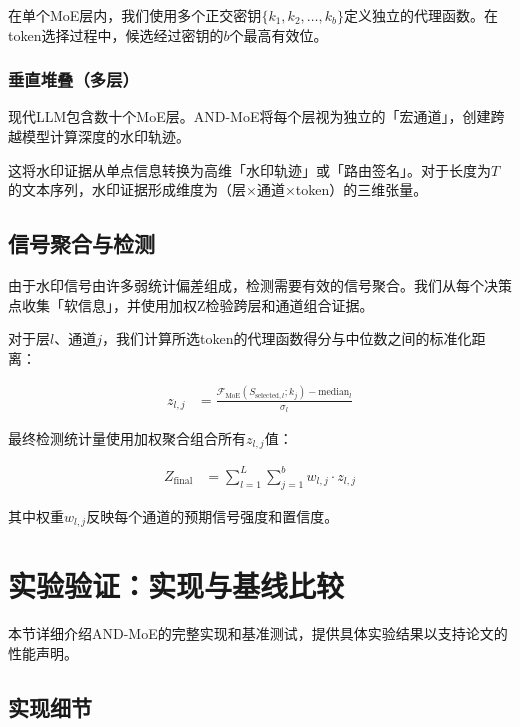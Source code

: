 \documentclass[letterpaper,twocolumn,10pt]{article}
\begin{document}
在单个MoE层内，我们使用多个正交密钥$\{k_1, k_2, \ldots, k_b\}$定义独立的代理函数。在token选择过程中，候选经过密钥的$b$个最高有效位。

\subsubsection{垂直堆叠（多层）}

现代LLM包含数十个MoE层。AND-MoE将每个层视为独立的「宏通道」，创建跨越模型计算深度的水印轨迹。

这将水印证据从单点信息转换为高维「水印轨迹」或「路由签名」。对于长度为$T$的文本序列，水印证据形成维度为（层×通道×token）的三维张量。

\subsection{信号聚合与检测}

由于水印信号由许多弱统计偏差组成，检测需要有效的信号聚合。我们从每个决策点收集「软信息」，并使用加权Z检验跨层和通道组合证据。

对于层$l$、通道$j$，我们计算所选token的代理函数得分与中位数之间的标准化距离：

\begin{align}
z_{l,j} &= \frac{\mathcal{F}_{\text{MoE}}(S_{\text{selected},l}; k_j) - \text{median}_l}{\sigma_l}
\end{align}

最终检测统计量使用加权聚合组合所有$z_{l,j}$值：

\begin{align}
Z_{\text{final}} &= \sum_{l=1}^L \sum_{j=1}^b w_{l,j} \cdot z_{l,j}
\end{align}

其中权重$w_{l,j}$反映每个通道的预期信号强度和置信度。

\section{实验验证：实现与基线比较}

本节详细介绍AND-MoE的完整实现和基准测试，提供具体实验结果以支持论文的性能声明。

\subsection{实现细节}
\end{document}

